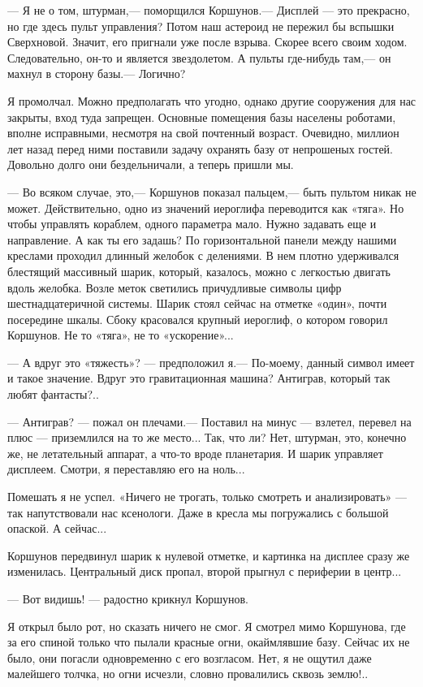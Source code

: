 \documentclass[11pt,a4paper,oneside]{article}
\begin{document}
— Я не о том, штурман,— поморщился Коршунов.— Дисплей — это прекрасно, но где здесь пульт управления? Потом наш астероид не пережил бы вспышки Сверхновой. Значит, его пригнали уже после взрыва. Скорее всего своим ходом. Следовательно, он-то и является звездолетом. А пульты где-нибудь там,— он махнул в сторону базы.— Логично?

Я промолчал. Можно предполагать что угодно, однако другие сооружения для нас закрыты, вход туда запрещен. Основные помещения базы населены роботами, вполне исправными, несмотря на свой почтенный возраст. Очевидно, миллион лет назад перед ними поставили задачу охранять базу от непрошеных гостей. Довольно долго они бездельничали, а теперь пришли мы.

— Во всяком случае, это,— Коршунов показал пальцем,— быть пультом никак не может. Действительно, одно из значений иероглифа переводится как «тяга». Но чтобы управлять кораблем, одного параметра мало. Нужно задавать еще и направление. А как ты его задашь?
По горизонтальной панели между нашими креслами проходил длинный желобок с делениями. В нем плотно удерживался блестящий массивный шарик, который, казалось, можно с легкостью двигать вдоль желобка. Возле меток светились причудливые символы цифр шестнадцатеричной системы. Шарик стоял сейчас на отметке «один», почти посередине шкалы. Сбоку красовался крупный иероглиф, о котором говорил Коршунов. Не то «тяга», не то «ускорение»...

— А вдруг это «тяжесть»? — предположил я.— По-моему, данный символ имеет и такое значение. Вдруг это гравитационная машина? Антиграв, который так любят фантасты?..

— Антиграв? — пожал он плечами.— Поставил на минус — взлетел, перевел на плюс — приземлился на то же место... Так, что ли? Нет, штурман, это, конечно же, не летательный аппарат, а что-то вроде планетария. И шарик управляет дисплеем. Смотри, я переставляю его на ноль...

Помешать я не успел. «Ничего не трогать, только смотреть и анализировать» — так напутствовали нас ксенологи. Даже в кресла мы погружались с большой опаской. А сейчас...

Коршунов передвинул шарик к нулевой отметке, и картинка на дисплее сразу же изменилась. Центральный диск пропал, второй прыгнул с периферии в центр...

— Вот видишь! — радостно крикнул Коршунов.

Я открыл было рот, но сказать ничего не смог. Я смотрел мимо Коршунова, где за его спиной только что пылали красные огни, окаймлявшие базу. Сейчас их не было, они погасли одновременно с его возгласом. Нет, я не ощутил даже малейшего толчка, но огни исчезли, словно провалились сквозь землю!..
\end{document}
